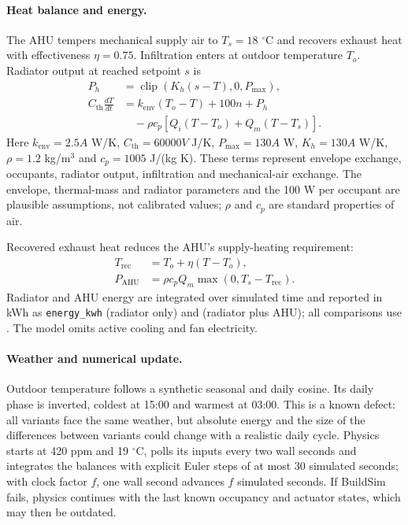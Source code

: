 \documentclass[11pt,a4paper]{article}
\begin{document}
\paragraph{Heat balance and energy.}
The AHU tempers mechanical supply air to $T_s=18$ $^\circ$C and recovers exhaust heat with effectiveness $\eta=0.75$. Infiltration enters at outdoor temperature $T_o$. Radiator output at reached setpoint $s$ is
\begin{align}
P_h&=\operatorname{clip}(K_h(s-T),0,P_{\max}),\\
C_{\mathrm{th}}\frac{dT}{dt}
 &= k_{\mathrm{env}}(T_o-T)+100n+P_h\nonumber\\
 &\quad-\rho c_p\left[Q_i(T-T_o)+Q_m(T-T_s)\right].
\end{align}
Here $k_{\mathrm{env}}=2.5A$ W/K, $C_{\mathrm{th}}=60000V$ J/K, $P_{\max}=130A$ W, $K_h=130A$ W/K, $\rho=1.2$ kg/m$^3$ and $c_p=1005$ J/(kg K). These terms represent envelope exchange, occupants, radiator output, infiltration and mechanical-air exchange. The envelope, thermal-mass and radiator parameters and the 100 W per occupant are plausible assumptions, not calibrated values; $\rho$ and $c_p$ are standard properties of air.

Recovered exhaust heat reduces the AHU's supply-heating requirement:
\begin{align}
T_{\mathrm{rec}}&=T_o+\eta(T-T_o),\\
P_{\mathrm{AHU}}&=\rho c_pQ_m\max(0,T_s-T_{\mathrm{rec}}).
\end{align}
Radiator and AHU energy are integrated over simulated time and reported in kWh as \texttt{energy\_kwh} (radiator only) and \protect{} (radiator plus AHU); all comparisons use \protect{}. The model omits active cooling and fan electricity.

\paragraph{Weather and numerical update.}
Outdoor temperature follows a synthetic seasonal and daily cosine. Its daily phase is inverted, coldest at 15:00 and warmest at 03:00. This is a known defect: all variants face the same weather, but absolute energy and the size of the differences between variants could change with a realistic daily cycle. Physics starts at 420 ppm and 19 $^\circ$C, polls its inputs every two wall seconds and integrates the balances with explicit Euler steps of at most 30 simulated seconds; with clock factor $f$, one wall second advances $f$ simulated seconds. If BuildSim fails, physics continues with the last known occupancy and actuator states, which may then be outdated.
\end{document}
